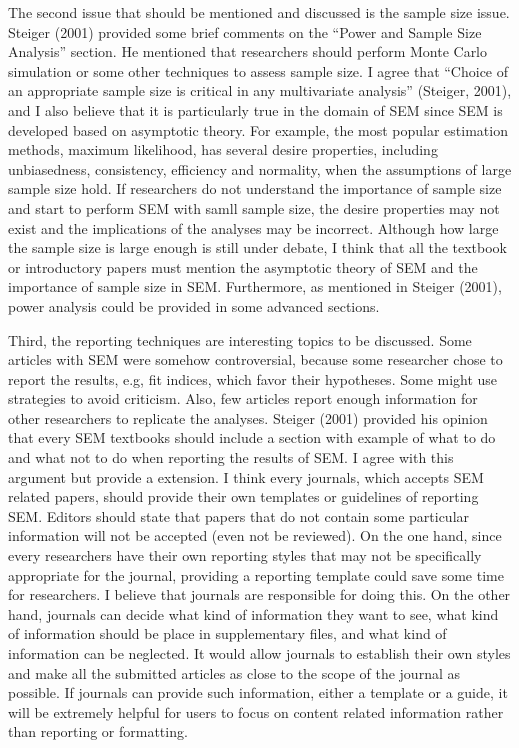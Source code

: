 \documentclass[jou]{apa6}
\theoremstyle{definition}
\theoremstyle{definition}
\theoremstyle{definition}
\theoremstyle{remark}
\begin{document}
The second issue that should be mentioned and discussed is the sample
size issue. Steiger (2001) provided some brief comments on the
\enquote{Power and Sample Size Analysis} section. He mentioned that
researchers should perform Monte Carlo simulation or some other
techniques to assess sample size. I agree that \enquote{Choice of an
appropriate sample size is critical in any multivariate analysis}
(Steiger, 2001), and I also believe that it is particularly true in the
domain of SEM since SEM is developed based on asymptotic theory. For
example, the most popular estimation methods, maximum likelihood, has
several desire properties, including unbiasedness, consistency,
efficiency and normality, when the assumptions of large sample size
hold. If researchers do not understand the importance of sample size and
start to perform SEM with samll sample size, the desire properties may
not exist and the implications of the analyses may be incorrect.
Although how large the sample size is large enough is still under
debate, I think that all the textbook or introductory papers must
mention the asymptotic theory of SEM and the importance of sample size
in SEM. Furthermore, as mentioned in Steiger (2001), power analysis
could be provided in some advanced sections.

Third, the reporting techniques are interesting topics to be discussed.
Some articles with SEM were somehow controversial, because some
researcher chose to report the results, e.g, fit indices, which favor
their hypotheses. Some might use strategies to avoid criticism. Also,
few articles report enough information for other researchers to
replicate the analyses. Steiger (2001) provided his opinion that every
SEM textbooks should include a section with example of what to do and
what not to do when reporting the results of SEM. I agree with this
argument but provide a extension. I think every journals, which accepts
SEM related papers, should provide their own templates or guidelines of
reporting SEM. Editors should state that papers that do not contain some
particular information will not be accepted (even not be reviewed). On
the one hand, since every researchers have their own reporting styles
that may not be specifically appropriate for the journal, providing a
reporting template could save some time for researchers. I believe that
journals are responsible for doing this. On the other hand, journals can
decide what kind of information they want to see, what kind of
information should be place in supplementary files, and what kind of
information can be neglected. It would allow journals to establish their
own styles and make all the submitted articles as close to the scope of
the journal as possible. If journals can provide such information,
either a template or a guide, it will be extremely helpful for users to
focus on content related information rather than reporting or
formatting.
\end{document}
